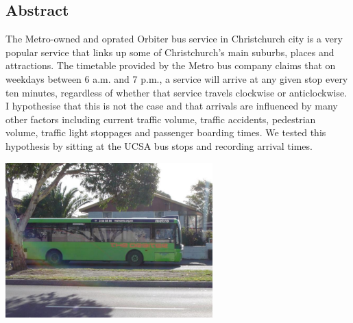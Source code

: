 \subsection*{Abstract}
The Metro-owned and oprated Orbiter bus service in Christchurch city is a very popular service that links up some of Christchurch's main suburbs, places and attractions. The timetable provided by the Metro bus company claims that on weekdays between 6 a.m. and 7 p.m., a service will arrive at any given stop every ten minutes, regardless of whether that service travels clockwise or anticlockwise. I hypothesise that this is not the case and that arrivals are influenced by many other factors including current traffic volume, traffic accidents, pedestrian volume, traffic light stoppages and passenger boarding times. We tested this hypothesis by sitting at the UCSA bus stops and recording arrival times.
\begin{center}
\includegraphics[width=8cm]{figures/OrbiterBus.pdf}
\end{center}

